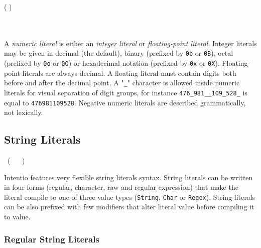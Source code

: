 \begin{bnf}
   \eq (  \gor {} ) \ \gtry{ \term{+} \gor \term{-} } \ \gmany{\term{\_}} \  \\
  \\
   \eq    {} \  \  \ 
             \gorln {} \ 
\end{bnf}

A \emph{numeric literal} is either an \emph{integer literal} or \emph{floating-point   literal}. Integer literals may be given in decimal (the default), binary (prefixed by \texttt{0b} or \texttt{0B}), octal (prefixed by \texttt{0o} or \texttt{0O}) or hexadecimal notation (prefixed by \texttt{0x} or \texttt{0X}). Floating-point literals are always decimal. A floating literal must contain digits both before and after the decimal point. A "\texttt{\_}" character is allowed inside numeric literals for visual separation of digit groups, for instance \lstinline{476_981__109_528_} is equal to \lstinline{476981109528}. Negative numeric literals are described grammatically, not lexically.

\subsection{String Literals}

\begin{bnf}
   \eq {} \ ( \  \gor {} \gor {} \gor {} \ )
\end{bnf}

Intentio features very flexible string literals syntax. String literals can be written in four forms (regular, character, raw and regular expression) that make the literal compile to one of three value types (\lstinline{String}, \lstinline{Char} or \lstinline{Regex}). String literals can be also prefixed with few modifiers that alter literal value before compiling it to value.

\subsubsection*{Regular String Literals}

\begin{bnf}
   \eq {} \  \ 
\end{bnf}

